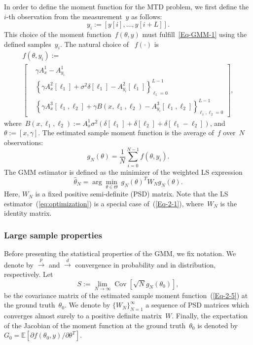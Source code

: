 \documentclass{article}
\newcommand{\E}[0]{\mathbb{E}}
\newcommand{\Cov}[0]{\operatorname{Cov}}
\begin{document}
In order to define the moment function for the MTD problem, we first define the $i$-th observation from the measurement~$y$ as follows:
\begin{equation}
	y_i := [y[i],\ldots, y[i+L]].
\end{equation}
This choice of the moment function~$f(\theta, y)$ must fulfill~\eqref{Eq-GMM-1} using the defined samples~$y_i$. The natural choice of ~$f(\cdot)$ is
\begin{multline} \label{Eq-GMM-2}
	f(\theta, y_i) := \\
	\begin{bmatrix}
		&\gamma A_x^1 - A_{y_i}^1\\
		&\left\{\gamma A_x^2[\ell_1] + \sigma^2 \delta[\ell_1] - A_{y_i}^2 [\ell_1]\right\}_{\ell_1 =0}^{L-1} \\
		&\left\{\gamma A_x^3[\ell_1, \ell_2] + \gamma B(x, \ell_1, \ell_2) - A_{y_i}^3[\ell_1, \ell_2]\right\}_{\ell_1, \ell_2 = 0}^{L-1}
	\end{bmatrix},
\end{multline}
where~$B(x, \ell_1, \ell_2) := A_{x}^1 \sigma^2 (\delta[\ell_1] + \delta[\ell_2] + \delta[\ell_1 - \ell_2])$, and~$\theta := [x, \gamma]$. The estimated sample moment function is the average of~$f$ over~$N$ observations:
\begin{equation}\label{Eq-2-5}
	g_N(\theta) = \frac{1}{N} \sum_{i = 0}^{N - 1} f(\theta, y_i).
\end{equation}
The GMM estimator is defined as the minimizer of the weighted LS expression
\begin{equation} \label{Eq-2-1}
	\hat{\theta}_N = \arg\min_{\theta \in \Theta} \ g_N(\theta)^T W_N g_N(\theta).
\end{equation}
Here, $W_N$ is a fixed positive semi-definite (PSD) matrix. Note that the LS estimator~(\ref{eq:optimization}) is a special case of~(\ref{Eq-2-1}), where~$W_N$ is the identity matrix.

\subsubsection{Large sample properties}
\label{gmm:large}
Before presenting the statistical properties of the GMM, we fix notation. We denote by $\overset{p}{\to}$ and $\overset{d}{\to}$ convergence in  probability and in distribution, respectively. Let
\begin{equation} \label{eqn:cov_mat_S}
	S := \lim_{N\to \infty}\Cov\left[\sqrt{N}g_N(\theta_0)\right],
\end{equation}
be the covariance matrix of the estimated sample moment function~(\ref{Eq-2-5}) at the ground truth~$\theta_0$. We denote by $\{W_N\}_{N=1}^\infty$ a sequence of PSD matrices which converges almost surely to a positive definite matrix~$W$. Finally, the expectation of the Jacobian of the moment function at the ground truth~$\theta_0$ is denoted by $G_0 = \E\left[\partial f(\theta_0, y) / \partial \theta^T\right]$.
\end{document}
